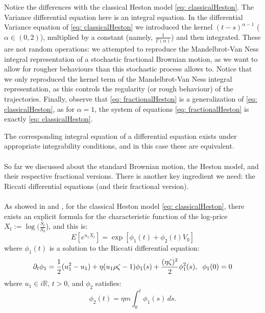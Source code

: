 \documentclass[a4paper,italian,11pt]{book}
\theoremstyle{plain}
\theoremstyle{remark}
\theoremstyle{plain}
\begin{document}
Notice the differences with the classical Heston model \eqref{eq: classicalHeston}. The Variance differential equation here is an integral equation. In the differential Variance equation of \eqref{eq: classicalHeston} we introduced the kernel $(t-s)^{\alpha-1}$ ($\alpha\in (0,2)$), multiplied by a constant (namely, $\frac{1}{\Gamma(\alpha)}$) and then integrated. 
These are not random operations: we attempted to reproduce the Mandelbrot-Van Ness integral representation of a stochastic fractional Brownian motion, as we want to allow for rougher behaviours than this stochastic process allows to. 
Notice that we only reproduced the kernel term of the Mandelbrot-Van Ness integral representation, as this controls the regularity (or rough behaviour) of the trajectories. 
Finally, observe that \eqref{eq: fractionalHeston} is a generalization of \eqref{eq: classicalHeston}, as for $\alpha=1$, the system of equations \eqref{eq: fractionalHeston} is exactly \eqref{eq: classicalHeston}.

The corresponding integral equation of a differential equation exists under appropriate integrability conditions, and in this case these are equivalent.
\\
\\

So far we discussed about the standard Brownian motion, the Heston model, and their respective fractional versions.
There is another key ingredient we need: the Riccati differential equations (and their fractional version). 
\\
\\

As showed in \cite{normalRiccati} and \cite{Omar}, for the classical Heston model \eqref{eq: classicalHeston}, there exists an explicit formula for the characteristic function of the log-price $X_t := \log(\frac{S_t}{S_0}$), and this is:
\begin{equation}
    \label{eq: characteristicNormal}
    E[e^{u_1X_t}] = \exp[\phi_1(t) + \phi_2(t)V_0]
\end{equation}
where  $\phi_1(t)$ is a solution to the Riccati differential equation:
\begin{equation}
    \label{eq: riccatiNormalphi2}
    \partial_t \phi_1 = \frac{1}{2}(u_1^2-u_1) + \eta (u_1 \rho \zeta-1) \phi_1(s)  +\frac{(\eta \zeta)^2}{2}\phi_1^2(s), \hspace{0.2cm} \phi_1(0)=0
\end{equation}
where $u_1\in i\mathbb{R}$, $t>0$, and $\phi_2$ satisfies:
\begin{equation}
    \label{phi1NormalRiccati}
    \phi_2(t) = \eta m\int_0^t \phi_1(s)\, ds.
\end{equation}
\end{document}
